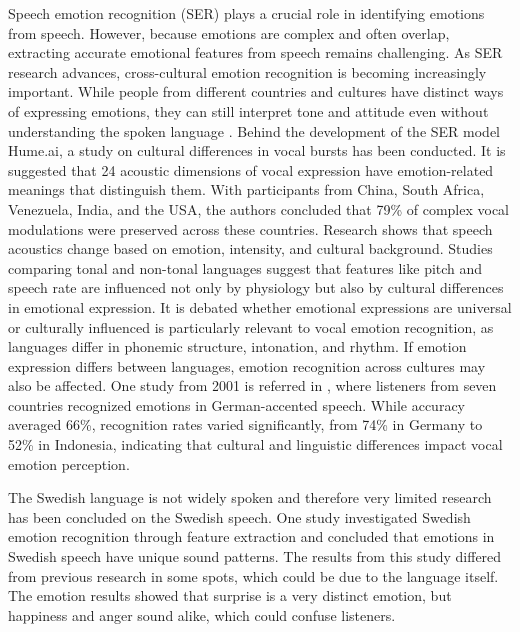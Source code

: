 Speech emotion recognition (SER) plays a crucial role in identifying emotions from speech. However, because emotions are complex and often overlap, extracting accurate emotional features from speech remains challenging. As SER research advances, cross-cultural emotion recognition is becoming increasingly important. While people from different countries and cultures have distinct ways of expressing emotions, they can still interpret tone and attitude even without understanding the spoken language \autocite{Cai2023}. Behind the development of the SER model Hume.ai, a study \autocite{Brooks2023} on cultural differences in vocal bursts has been conducted. It is suggested that 24 acoustic dimensions of vocal expression have emotion-related meanings that distinguish them. With participants from China, South Africa, Venezuela, India, and the USA, the authors concluded that 79\% of complex vocal modulations were preserved across these countries. Research shows that speech acoustics change based on emotion, intensity, and cultural background. Studies comparing tonal and non-tonal languages \autocite{Scherer2018} suggest that features like pitch and speech rate are influenced not only by physiology but also by cultural differences in emotional expression. It is debated whether emotional expressions are universal or culturally influenced is particularly relevant to vocal emotion recognition, as languages differ in phonemic structure, intonation, and rhythm. If emotion expression differs between languages, emotion recognition across cultures may also be affected. One study from 2001 is referred in \autocite{Scherer2018}, where listeners from seven countries recognized emotions in German-accented speech. While accuracy averaged 66\%, recognition rates varied significantly, from 74\% in Germany to 52\% in Indonesia, indicating that cultural and linguistic differences impact vocal emotion perception. 

The Swedish language is not widely spoken and therefore very limited research has been concluded on the Swedish speech. One study \autocite{Ekberg2023} investigated Swedish emotion recognition through feature extraction and concluded that emotions in Swedish speech have unique sound patterns. The results from this study differed from previous research in some spots, which could be due to the language itself. The emotion results showed that surprise is a very distinct emotion, but happiness and anger sound alike, which could confuse listeners. 

